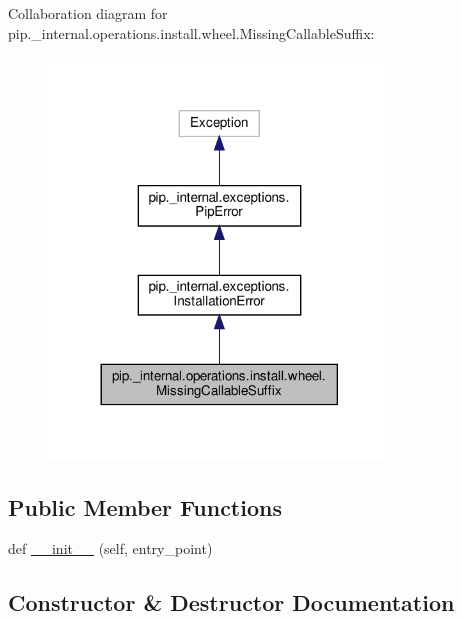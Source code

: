 Collaboration diagram for pip.\+\_\+internal.\+operations.\+install.\+wheel.\+Missing\+Callable\+Suffix\+:
\nopagebreak
\begin{figure}[H]
\begin{center}
\leavevmode
\includegraphics[width=257pt]{classpip_1_1__internal_1_1operations_1_1install_1_1wheel_1_1MissingCallableSuffix__coll__graph}
\end{center}
\end{figure}
\subsection*{Public Member Functions}
\begin{DoxyCompactItemize}
\item 
def \hyperlink{classpip_1_1__internal_1_1operations_1_1install_1_1wheel_1_1MissingCallableSuffix_a3c0b366c903c24005e92ceb1b564f6ab}{\+\_\+\+\_\+init\+\_\+\+\_\+} (self, entry\+\_\+point)
\end{DoxyCompactItemize}


\subsection{Constructor \& Destructor Documentation}
\mbox{\label{classpip_1_1__internal_1_1operations_1_1install_1_1wheel_1_1MissingCallableSuffix_a3c0b366c903c24005e92ceb1b564f6ab}} 
